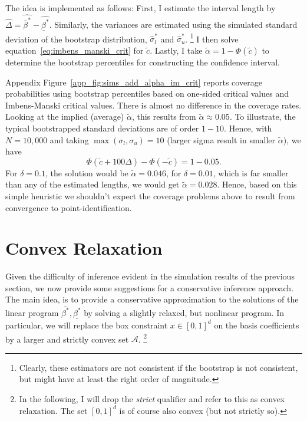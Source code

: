 \documentclass[12pt,a4paper,english]{article} %
\numberwithin{equation}{section}
\theoremstyle{definition}
\theoremstyle{remark}
\theoremstyle{plain}
\begin{document}
The idea is implemented as follows:
First, I estimate the interval length by $\hat{\Delta} = \hat{\overline{\beta}^*} - \hat{\underline{\beta}^*}$.
Similarly, the variances are estimated using the simulated standard deviation of the bootstrap distribution, $\hat{\sigma}_l^*$ and $\hat{\sigma}_u^*$.
\footnote{Clearly, these estimators are not consistent if the bootstrap is not consistent, but might have at least the right order of magnitude.}
I then solve equation~\ref{eq:imbens_manski_crit} for $\tilde{c}$.
Lastly, I take $\tilde{\alpha} = 1 - \Phi(\tilde{c})$ to determine the bootstrap percentiles for constructing the confidence interval.

Appendix Figure~\ref{app_fig:sims_add_alpha_im_crit} reports coverage probabilities using bootstrap percentiles based on one-sided critical values and Imbens-Manski critical values.
There is almost no difference in the coverage rates.
Looking at the implied (average) $\tilde{\alpha}$, this results from $\tilde{\alpha} \approx 0.05$.
To illustrate, the typical bootstrapped standard deviations are of order $1-10$.
Hence, with $N = 10,000$ and taking $\max(\sigma_l, \sigma_u)=10$ (larger sigma result in smaller $\tilde{\alpha}$), we have
\begin{equation*}
  \Phi\left(\tilde{c} + 100\Delta\right) - \Phi\left(-\tilde{c}\right) = 1 - 0.05.
\end{equation*}
For $\delta=0.1$, the solution would be $\tilde{\alpha} = 0.046$, for $\delta=0.01$, which is far smaller than any of the estimated lengths, we would get $\tilde{\alpha} = 0.028$.
Hence, based on this simple heuristic we shouldn't expect the coverage problems above to result from convergence to point-identification.

\section{Convex Relaxation}
Given the difficulty of inference evident in the simulation results of the previous section, we now provide some suggestions for a conservative inference approach.
The main idea, is to provide a conservative approximation to the solutions of the linear program $\overline{\beta^*}, \underline{\beta^*}$ by solving a slightly relaxed, but nonlinear program.
In particular, we will replace the box constraint $x\in[0,1]^d$ on the basis coefficients by a larger and strictly convex set $\mathcal{A}$.
\footnote{In the following, I will drop the \textit{strict} qualifier and refer to this as convex relaxation. The set $[0,1]^d$ is of course also convex (but not strictly so).}
\end{document}
